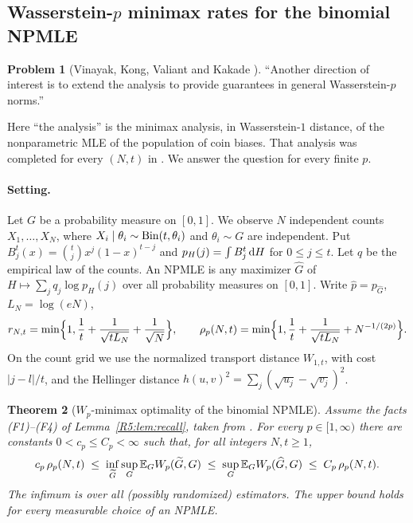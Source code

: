 \documentclass[11pt]{amsart}
\newtheorem{theorem}{Theorem}[section]
\theoremstyle{definition}
\newtheorem{problem}[theorem]{Problem}
\theoremstyle{remark}
\begin{document}
\subsection{Wasserstein-\texorpdfstring{$p$}{p} minimax rates for the binomial NPMLE}
\label{R5:sec:wp}

\begin{problem}[Vinayak, Kong, Valiant and Kakade {\cite[Sec.~5]{R5-VKVK19}}]
\label{R5:prob:wp}
``Another direction of interest is to extend the analysis to provide
guarantees in general Wasserstein-$p$ norms.''
\end{problem}

Here ``the analysis'' is the minimax analysis, in Wasserstein-$1$ distance,
of the nonparametric MLE of the population of coin biases.  That analysis
was completed for every $(N,t)$ in \cite[Part~VI, Theorem
p06:bm:full]{K-029}.  We answer the question for every finite $p$.

\paragraph{Setting.}
Let $G$ be a probability measure on $[0,1]$.  We observe $N$ independent
counts $X_1,\dots,X_N$, where $X_i\mid\theta_i\sim\operatorname{Bin}(t,\theta_i)$ and
$\theta_i\sim G$ are independent.  Put $B^t_j(x)=\binom tj x^j(1-x)^{t-j}$
and $p_H(j)=\int B^t_j\,\mathrm{d} H$ for $0\le j\le t$.  Let $q$ be the empirical
law of the counts.  An NPMLE is any maximizer $\widehat G$ of
$H\mapsto\sum_j q_j\log p_H(j)$ over all probability measures on $[0,1]$.
Write $\widehat p=p_{\widehat G}$, $L_N=\log(eN)$,
\[
 r_{N,t}=\min\Bigl\{1,\frac1t+\frac1{\sqrt{tL_N}}+\frac1{\sqrt N}\Bigr\},
 \qquad
 \rho_p(N,t)=\min\Bigl\{1,\frac1t+\frac1{\sqrt{tL_N}}+N^{-1/(2p)}\Bigr\}.
\]
On the count grid we use the normalized transport distance $W_{1,t}$, with
cost $|j-l|/t$, and the Hellinger distance
$h(u,v)^2=\sum_j(\sqrt{u_j}-\sqrt{v_j})^2$.

\begin{theorem}[$W_p$-minimax optimality of the binomial NPMLE]
\label{R5:thm:wp}
Assume the facts (F1)--(F4) of Lemma~\ref{R5:lem:recall}, taken from
\cite[Part~VI]{K-029}. For every $p\in[1,\infty)$ there are constants $0<c_p\le C_p<\infty$ such
that, for all integers $N,t\ge1$,
\begin{equation}\label{R5:eq:wp}
 c_p\,\rho_p(N,t)\;\le\;\inf_{\widetilde G}\sup_G\mathbb{E}_G W_p(\widetilde G,G)
 \;\le\;\sup_G\mathbb{E}_G W_p(\widehat G,G)\;\le\;C_p\,\rho_p(N,t).
\end{equation}
The infimum is over all (possibly randomized) estimators.  The upper bound
holds for every measurable choice of an NPMLE.
\end{theorem}
\end{document}
